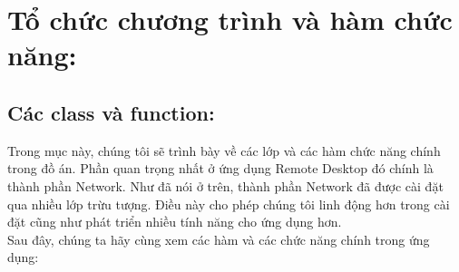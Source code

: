 \section{Tổ chức chương trình và hàm chức năng: }

\subsection{Các class và function: }
Trong mục này, chúng tôi sẽ trình bày về các lớp và các hàm chức năng chính trong đồ án. Phần quan trọng nhất ở ứng dụng Remote Desktop đó chính là thành phần Network. Như đã nói ở trên, thành phần Network đã được cài đặt qua nhiều lớp trừu tượng. Điều này cho phép chúng tôi linh động hơn trong cài đặt cũng như phát triển nhiều tính năng cho ứng dụng hơn. \\

Sau đây, chúng ta hãy cùng xem các hàm và các chức năng chính trong ứng dụng:
